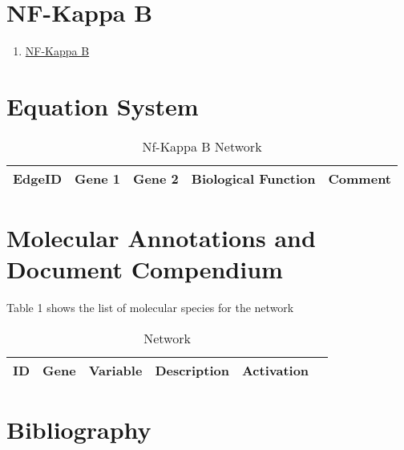 
\section{NF-Kappa B}

\begin{enumerate}
\item \href{https://www.genome.jp/kegg-bin/show_pathway?map=hsa04064&show_description=show}{NF-Kappa B}
\end{enumerate}

\section{Equation System}


\begin{table}[H]
	\tiny
	\begin{tabular}{p{1cm}p{1cm}p{3cm}p{1cm}p{1cm}} 
		EdgeID & Gene 1 & Gene 2 & Biological Function & Comment \\
		\hline
    
    \end{tabular}
	\caption{Nf-Kappa B Network}
	\label{tab:Table2}
\end{table}


\section{Molecular Annotations and Document Compendium}

Table 1 shows the list of molecular species for the network
\vspace{8pt}
\begin{table}[H]
	\begin{tabular}{rlllll}
		\hline
		ID & Gene & Variable & Description & Activation \\ 
		\hline

		\hline
	\end{tabular}
	\caption{Network}
	\label{tab:Table2}
\end{table}

\section{Bibliography}

